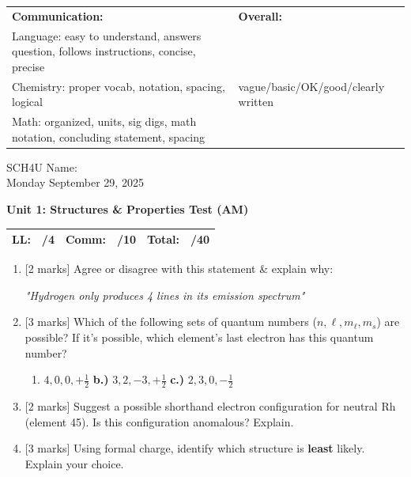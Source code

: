 \documentclass[11pt]{article}
\newcommand{\headerbox}{
    \noindent\begin{tabular}{|p{11cm}|p{5.5cm}|}
    \hline
    \scriptsize \textbf{Communication:} & \scriptsize \textbf{Overall:}\\
    \scriptsize Language: easy to understand, answers question, follows instructions, concise, precise & \\
    \scriptsize Chemistry: proper vocab, notation, spacing, logical & \scriptsize \space\space \space\space vague/basic/OK/good/clearly written \\
    \scriptsize Math: organized, units, sig digs, math notation, concluding statement, spacing & \\
    \hline
    \end{tabular}
    \vspace{1em}
}
\begin{document}
\headerbox

\noindent SCH4U \hfill Name: \underline{\hspace{5cm}} \\
\indent \hfill Monday September 29, 2025 \vspace{1em}

\begin{center}
    \Large \textbf{Unit 1: Structures \& Properties Test (AM)}
\end{center}

\begin{center}
    \begin{tabular}{|lc|lc|lc|}
    \hline
    LL: & \space\space /4 & Comm: & \space\space /10 & Total: & \space\space /40 \\
    \hline
    \end{tabular}
\end{center}
\vspace{1em}

\begin{enumerate}[leftmargin=*, label=\arabic*.]
    \item {[2 marks]} Agree or disagree with this statement \& explain why:
    \begin{center}
        \textit{"Hydrogen only produces 4 lines in its emission spectrum"}
    \end{center}
    \vspace{6em}

    \item {[3 marks]} Which of the following sets of quantum numbers ($n, \ell, m_\ell, m_s$) are possible? If it's possible, which element's last electron has this quantum number?
    \begin{enumerate}[label=\textbf{\alph*.)}, itemsep=2em, topsep=1em]
        \item $4, 0, 0, +\frac{1}{2}$ \hspace{3cm} \textbf{b.)} $3, 2, -3, +\frac{1}{2}$ \hspace{3cm} \textbf{c.)} $2, 3, 0, -\frac{1}{2}$
    \end{enumerate}
    \vspace{4em}

    \item {[2 marks]} Suggest a possible shorthand electron configuration for neutral Rh (element 45). Is this configuration anomalous? Explain.
    \vspace{6em}

    \item {[3 marks]} Using formal charge, identify which structure is \textbf{least} likely. Explain your choice.
    \vspace{1em}
    
    \indent {} \vspace{1.5em}
    
    \indent {} \vspace{1.5em}
    
    \indent {}
    \vspace{6em}
\end{enumerate}
\end{document}
